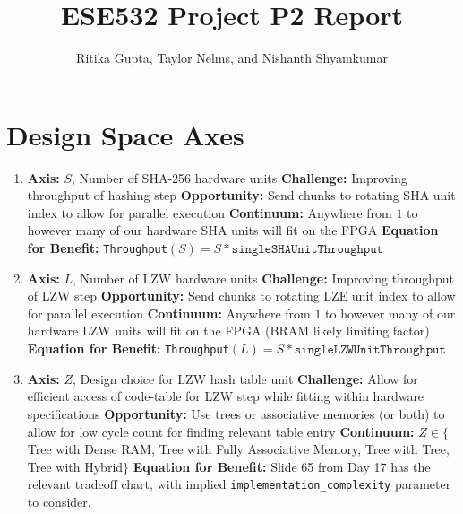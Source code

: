 \documentclass{article}
\title{ESE532 Project P2 Report}
\author{Ritika Gupta, Taylor Nelms, and Nishanth Shyamkumar}
\begin{document}
\maketitle


\section{Design Space Axes}
\begin{enumerate}
\item%

\textbf{Axis:} $S$, Number of SHA-256 hardware units
\newline
\textbf{Challenge:} Improving throughput of hashing step
\newline
\textbf{Opportunity:} Send chunks to rotating SHA unit index to allow for parallel execution
\newline
\textbf{Continuum:} Anywhere from $1$ to however many of our hardware SHA units will fit on the FPGA
\newline
\textbf{Equation for Benefit:} \texttt{Throughput}$\left(S\right)=S*\texttt{singleSHAUnitThroughput}$

\item%

\textbf{Axis:} $L$, Number of LZW hardware units
\newline
\textbf{Challenge:} Improving throughput of LZW step
\newline
\textbf{Opportunity:} Send chunks to rotating LZE unit index to allow for parallel execution
\newline
\textbf{Continuum:} Anywhere from $1$ to however many of our hardware LZW units will fit on the FPGA (BRAM likely limiting factor)
\newline
\textbf{Equation for Benefit:} \texttt{Throughput}$\left(L\right)=S*\texttt{singleLZWUnitThroughput}$

\item%

\textbf{Axis:} $Z$, Design choice for LZW hash table unit
\newline
\textbf{Challenge:} Allow for efficient access of code-table for LZW step while fitting within hardware specifications
\newline
\textbf{Opportunity:} Use trees or associative memories (or both) to allow for low cycle count for finding relevant table entry
\newline
\textbf{Continuum:} $Z\in\{$Tree with Dense RAM, Tree with Fully Associative Memory, Tree with Tree, Tree with Hybrid$\}$
\newline
\textbf{Equation for Benefit:} Slide 65 from Day 17 has the relevant tradeoff chart, with implied \texttt{implementation\_complexity} parameter to consider.


\end{enumerate}
\end{document}
